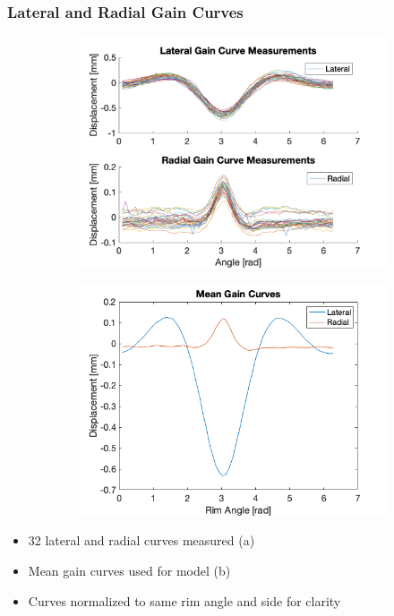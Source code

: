 \documentclass[mathserif]{beamer}
\begin{document}
\begin{frame}
\frametitle{Lateral and Radial Gain Curves	}
\begin{figure}
        \centering
        \begin{subfigure}[b]{0.475\textwidth}
            \includegraphics[width=\textwidth]{lat_rad_GC_raw}
            \caption{}
        \end{subfigure}
        \begin{subfigure}[b]{0.475\textwidth}
            \includegraphics[width=\textwidth]{lat_rad_GC_mean}
            \caption{}
        \end{subfigure}
\end{figure}
\begin{itemize}
    \item 32 lateral and radial curves measured (a)
    \item Mean gain curves used for model (b)
    \item Curves normalized to same rim angle and side for clarity
\end{itemize}
\end{frame}
\end{document}
